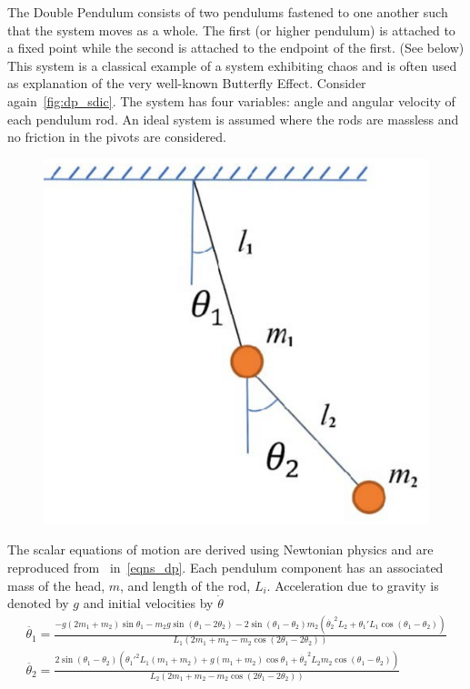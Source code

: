 The Double Pendulum consists of two pendulums fastened to one another such that the system moves as a whole. The first (or higher pendulum) is attached to a fixed point while the second is attached to the endpoint of the first. (See below)
This system is a classical example of a system exhibiting chaos and is often used as explanation of the very well-known Butterfly Effect.  Consider again~\ref{fig:dp_sdic}.
The system has four variables: angle and angular velocity of each pendulum rod. An ideal system is assumed where the rods are massless and no friction in the pivots are considered.
\begin{figure}[ht]
  \includegraphics[scale=0.35]{Graphs/_dp_setup.eps}
  \centering
  \label{fig:dp_setup}
\end{figure}

The scalar equations of motion are derived using Newtonian physics and are reproduced from~\cite{DPFormulas} in~\ref{eqns_dp}. Each pendulum component has an associated mass of the head, $m$, and length of the rod, $L_i$. Acceleration due to gravity is denoted by $g$ and initial velocities by $\dot{\theta}$
\begin{eqnarray}\label{eqns_dp}
  \ddot{\theta_{1}}  = \frac{-g(2m_1+m_2)\sin{\theta_1} - m_2g\sin(\theta_1-2\theta_2) - 2\sin(\theta_1-\theta_2)m_2({\dot{\theta_{2}}}^{2}L_2 + {\theta_{1}'}L_1\cos(\theta_1-\theta_2))} {L_1(2m_1 + m_2 -m_2\cos(2\theta_1 - 2\theta_2))}
  \\
  \ddot{\theta_{2}} = \frac{2\sin(\theta_1-\theta_2)(\theta_{1}'^{2}L_1(m_1+m_2) + g(m_1+m_2)\cos\theta_1 + \dot{\theta_{2}}^{2}L_2m_2\cos(\theta_1-\theta_2))}{L_2(2m_1 + m_2 -m_2\cos(2\theta_1 - 2\theta_2))}
\end{eqnarray}

